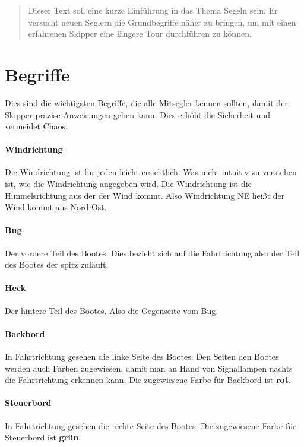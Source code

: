 \documentclass[12pt]{article}
\begin{document}
\maketitle

\begin{abstract}
Dieser Text soll eine kurze Einführung in das Thema Segeln sein. Er versucht neuen Seglern die Grundbegriffe näher zu bringen, um mit einen erfahrenen Skipper eine längere Tour durchführen zu können.
\end{abstract}

\section{Begriffe}
Dies sind die wichtigsten Begriffe, die alle Mitsegler kennen sollten, damit der Skipper präzise Anweisungen geben kann. Dies erhöht die Sicherheit und vermeidet Chaos.

\paragraph{Windrichtung}
Die Windrichtung ist für jeden leicht ersichtlich. Was nicht intuitiv zu verstehen ist, wie die Windrichtung angegeben wird. Die Windrichtung ist die Himmelsrichtung aus der der Wind kommt. Also Windrichtung NE heißt der Wind kommt aus Nord-Ost.

\paragraph{Bug}
Der vordere Teil des Bootes. Dies bezieht sich auf die Fahrtrichtung also der Teil des Bootes der spitz zuläuft.

\paragraph{Heck}
Der hintere Teil des Bootes. Also die Gegenseite vom Bug.

\paragraph{Backbord}
In Fahrtrichtung gesehen die linke Seite des Bootes. Den Seiten den Bootes werden auch Farben zugewiesen, damit man an Hand von Signallampen nachts die Fahrtrichtung erkennen kann. Die zugewiesene Farbe für Backbord ist \textbf{rot}.

\paragraph{Steuerbord}
In Fahrtrichtung gesehen die rechte Seite des Bootes. Die zugewiesene Farbe für Steuerbord ist \textbf{grün}.
\end{document}
